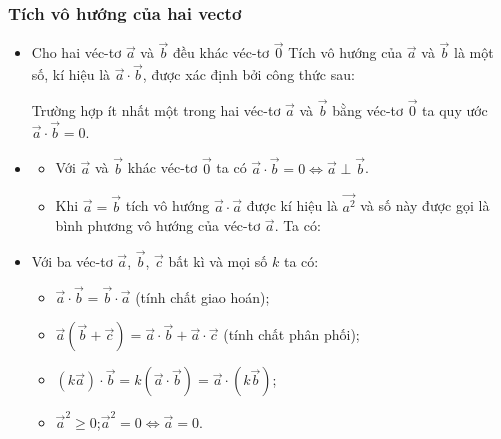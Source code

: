 \subsubsection{Tích vô hướng của hai vectơ} 
\begin{itemize}
	\item [\iconMT] Cho hai véc-tơ $\overrightarrow{a}$ và $\overrightarrow{b}$ đều khác véc-tơ $\overrightarrow{0}$ Tích vô hướng của $\overrightarrow{a}$ và $\overrightarrow{b}$ là một số, kí hiệu là $\overrightarrow{a}\cdot\overrightarrow{b}$, được xác định bởi công thức sau:
	\begin{luuy}
		Trường hợp ít nhất một trong hai véc-tơ $\overrightarrow{a}$ và $\overrightarrow{b}$ bằng véc-tơ $\vec{0}$ ta quy ước $\overrightarrow{a}\cdot\overrightarrow{b}=0$.
	\end{luuy}
	\item [\iconMT] 
		\begin{itemize}
			\item Với $\overrightarrow{a}$ và $\overrightarrow{b}$ khác véc-tơ $\overrightarrow{0}$ ta có $\overrightarrow{a}\cdot\overrightarrow{b}=0\Leftrightarrow \overrightarrow{a}\perp \overrightarrow{b}$. 
			\item Khi $\overrightarrow{a}=\overrightarrow{b}$ tích vô hướng $\overrightarrow{a}\cdot\overrightarrow{a}$ được kí hiệu là $\overrightarrow{a^2}$ và số này được gọi là bình phương vô hướng của véc-tơ $\overrightarrow{a}$. Ta có:
		\end{itemize}
	\item [\iconMT] 
Với ba véc-tơ $\overrightarrow{a}$, $\overrightarrow{b}$, $\overrightarrow{c}$ bất kì và mọi số $k$ ta có:
\begin{tcolorbox}[colframe=orange,colback=white,boxrule=0.2mm]
		\begin{itemize}
			\item $\overrightarrow{a}\cdot \overrightarrow{b}=\overrightarrow{b}\cdot \overrightarrow{a}$ (tính chất giao hoán);
			\item $\overrightarrow{a}\left(\overrightarrow{b}+\overrightarrow{c}\right)=\overrightarrow{a}\cdot \overrightarrow{b}+\overrightarrow{a}\cdot \overrightarrow{c}$ (tính chất phân phối);
			\item $(k\overrightarrow{a})\cdot \overrightarrow{b}=k(\overrightarrow{a}\cdot \overrightarrow{b})=\overrightarrow{a}\cdot (k\overrightarrow{b})$;
			\item $\overrightarrow{a}^2\ge 0$;\quad $\overrightarrow{a}^2=0\Leftrightarrow \overrightarrow{a}=0$.
		\end{itemize}
\end{tcolorbox}
\end{itemize}
